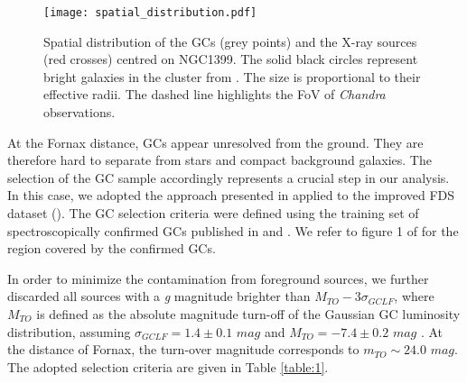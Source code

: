 \documentclass{aa}
\begin{document}
\begin{figure*}[t]
    \centering
    \texttt{[image: spatial\_distribution.pdf]}
    \caption{Spatial distribution of the GCs (grey points) and the X-ray sources (red crosses) centred on NGC1399. The solid black circles represent bright galaxies in the cluster from \cite{Ferguson1998}. The size is proportional to their effective radii. The dashed line highlights the FoV of \textit{Chandra} observations.}
    \label{fig:d'abrusco}
\end{figure*}

At the Fornax distance, GCs appear unresolved from the ground. They are therefore hard to separate from stars and compact background galaxies. The selection of the GC sample accordingly represents a crucial step in our analysis. In this case, we adopted the approach presented in \cite{Cantiello2018} applied to the improved FDS dataset (\citealt{Cantiello2020}). The GC selection criteria were defined using the training set of spectroscopically confirmed GCs published in  \cite{Pota2018} and \cite{Schuberth2010}. We refer to figure 1 of \cite{Pota2018} for the region covered by the confirmed GCs. 

In order to minimize the contamination from foreground sources, we further discarded all sources with a \textit{g} magnitude brighter than $M_{TO}-3\sigma_{GCLF}$, where $M_{TO}$ is defined as the absolute magnitude turn-off of the Gaussian GC luminosity distribution, assuming $\sigma_{GCLF}=1.4\pm0.1$ $mag$ and $M_{TO}=-7.4\pm0.2$ $mag$ \citep[e.g.][]{Villegas2010}. At the distance of Fornax, the turn-over magnitude corresponds to $m_{TO}\sim24.0$ $mag$. The adopted selection criteria are given in Table \ref{table:1}.
\end{document}
